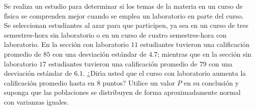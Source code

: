 \begin{enunciado}
 Se realiza un estudio para determinar si los temas de la materia en un curso de f\'{\i}sica se comprenden mejor cuando se emplea un laboratorio en parte del curso. Se seleccionan estudiantes al azar para que participen, ya sea en un curso de tres semestres-hora sin laboratorio o en un curso de cuatro semestres-hora con laboratorio. En la secci\'on con laboratorio $11$ estudiantes tuvieron una calificaci\'on promedio de $85$ con una desviaci\'on est\'andar de $4.7$; mientras que en la secci\'on sin laboratorio $17$ estudiantes tuvieron una calificaci\'on promedio de $79$ con una desviaci\'on est\'andar de $6.1$. ¿Dir\'{\i}a usted que el curso con laboratorio aumenta la calificaci\'on promedio hasta en $8$ puntos? Utilice un valor $P$ en su conclusi\'on y suponga que las poblaciones se distribuyen de forma aproximadamente normal con varianzas iguales.
\end{enunciado}

